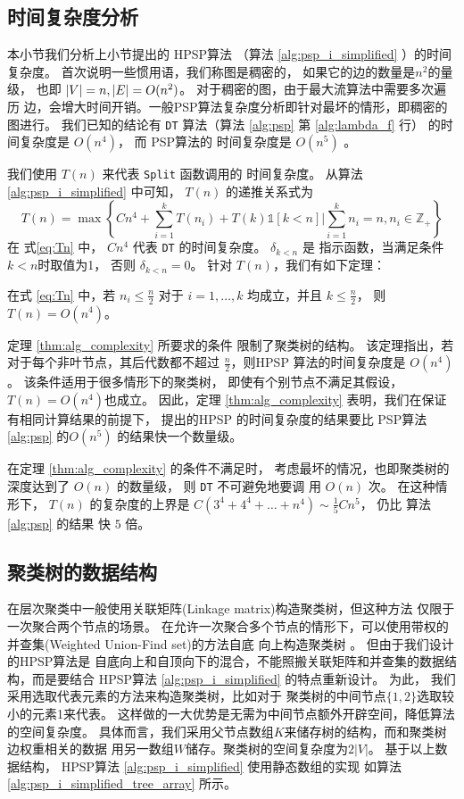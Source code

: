 \subsection{时间复杂度分析}

本小节我们分析上小节提出的 HPSP算法 （算法 \ref{alg:psp_i_simplified} ）的时间复杂度。
首次说明一些惯用语，我们称图是稠密的，
如果它的边的数量是$n^2$的量级，
也即 $\lvert V\rvert = n, \lvert E\rvert = O(n^2)$。
对于稠密的图，由于最大流算法中需要多次遍历
边，会增大时间开销。一般PSP算法复杂度分析即针对最坏的情形，即稠密的图进行。
我们已知的结论有 \texttt{DT} 算法（算法 \ref{alg:psp} 第 \ref{alg:lambda_f} 行）
的时间复杂度是 $O(n^4)$， 而 PSP算法的 
时间复杂度是 $O(n^5)$ \citep{chan2017pin}。

我们使用 $T(n)$ 来代表 
\texttt{Split} 函数调用的
时间复杂度。
从算法 \ref{alg:psp_i_simplified} 中可知，
$T(n)$ 的递推关系式为
\begin{equation}\label{eq:Tn}
T(n) = \max \left\{ C n^4 + \sum_{i=1}^k T(n_i) +
T(k)\mathds{1}[k<n] \Big|
\sum_{i=1}^k n_i = n, n_i \in \mathbb{Z}_{+} \right\}
\end{equation}
在 式\eqref{eq:Tn} 中，
$Cn^4$ 代表 \texttt{DT} 的时间复杂度。
$\delta_{k<n}$ 是 指示函数，当满足条件 $k<n$时取值为1，
否则 $\delta_{k<n}=0$。
针对 $T(n)$，我们有如下定理：
\begin{theorem}\label{thm:alg_complexity}
  在式 \eqref{eq:Tn} 中，若 $n_i \leq \frac{n}{2}$ 对于 $i=1,\dots,k$ 均成立，并且
   $ k \leq \frac{n}{2}$， 
   则 $T(n) = O(n^4)$。
\end{theorem}

定理 \ref{thm:alg_complexity} 所要求的条件
限制了聚类树的结构。
该定理指出，若对于每个非叶节点，其后代数都不超过 $\frac{n}{2}$，则HPSP
算法的时间复杂度是  $O(n^4)$。
该条件适用于很多情形下的聚类树，
即使有个别节点不满足其假设，$T(n) = O(n^4)$也成立。
因此，定理 \ref{thm:alg_complexity} 表明，我们在保证有相同计算结果的前提下，
提出的HPSP 的时间复杂度的结果要比
PSP算法 \ref{alg:psp} 的$O(n^5)$ 的结果快一个数量级。

在定理 \ref{thm:alg_complexity} 的条件不满足时，
考虑最坏的情况，也即聚类树的深度达到了 $O(n)$ 的数量级，
则 \texttt{DT} 不可避免地要调 用 $O(n)$ 次。
在这种情形下，
$T(n)$ 的复杂度的上界是 $C(3^4+4^4 + \dots + n^4) \sim \frac{1}{5}Cn^5$，
仍比 算法 \ref{alg:psp} 的结果
快 $5$ 倍。
\subsection{聚类树的数据结构}
在层次聚类中一般使用关联矩阵(Linkage matrix)构造聚类树，但这种方法
仅限于一次聚合两个节点的场景。
在允许一次聚合多个节点的情形下，可以使用带权的并查集(Weighted Union-Find set)的方法自底
向上构造聚类树
\cite{chan2020agglomerative}。 
但由于我们设计的HPSP算法是
自底向上和自顶向下的混合，不能照搬关联矩阵和并查集的数据结构，而是要结合
HPSP算法 \ref{alg:psp_i_simplified} 的特点重新设计。
为此，
我们采用选取代表元素的方法来构造聚类树，比如对于
聚类树的中间节点$\{1,2\}$选取较小的元素1来代表。
这样做的一大优势是无需为中间节点额外开辟空间，降低算法的空间复杂度。
具体而言，我们采用父节点数组$K$来储存树的结构，而和聚类树边权重相关的数据
用另一数组$W$储存。聚类树的空间复杂度为$2|V|$。
基于以上数据结构，
HPSP算法 \ref{alg:psp_i_simplified} 使用静态数组的实现
如算法 \ref{alg:psp_i_simplified_tree_array} 所示。

